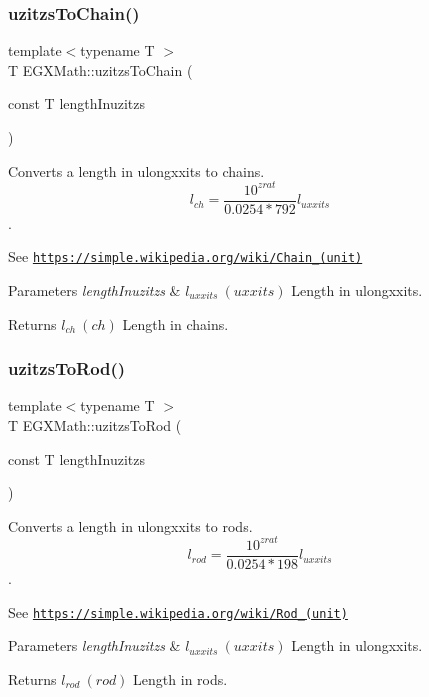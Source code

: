 \subsubsection{\texorpdfstring{uzitzs\+To\+Chain()}{uzitzsToChain()}}
{\footnotesize\ttfamily template$<$typename T $>$ \\
T E\+G\+X\+Math\+::uzitzs\+To\+Chain (\begin{DoxyParamCaption}\item[{const T}]{length\+Inuzitzs }\end{DoxyParamCaption})}



Converts a length in ulongxxits to chains. \[ l_{ch}= \frac{10^{zrat}}{0.0254 * 792} l_{uxxits} \]. 

See \href{https://simple.wikipedia.org/wiki/Chain_(unit)}{\tt https\+://simple.\+wikipedia.\+org/wiki/\+Chain\+\_\+(unit)} 
\begin{DoxyParams}{Parameters}
{\em length\+Inuzitzs} & $ l_{uxxits}\ (uxxits)$ Length in ulongxxits. \\
\hline
\end{DoxyParams}
\begin{DoxyReturn}{Returns}
$ l_{ch}\ (ch)$ Length in chains. 
\end{DoxyReturn}
\mbox{\label{group___e_g_x_math-_conversions-_length_conversions-_non-_s_i-uzitzs-_surveyors_gaf6062ab067930d296074de9e8301871d}} 
\subsubsection{\texorpdfstring{uzitzs\+To\+Rod()}{uzitzsToRod()}}
{\footnotesize\ttfamily template$<$typename T $>$ \\
T E\+G\+X\+Math\+::uzitzs\+To\+Rod (\begin{DoxyParamCaption}\item[{const T}]{length\+Inuzitzs }\end{DoxyParamCaption})}



Converts a length in ulongxxits to rods. \[ l_{rod}= \frac{10^{zrat}}{0.0254 * 198} l_{uxxits} \]. 

See \href{https://simple.wikipedia.org/wiki/Rod_(unit)}{\tt https\+://simple.\+wikipedia.\+org/wiki/\+Rod\+\_\+(unit)} 
\begin{DoxyParams}{Parameters}
{\em length\+Inuzitzs} & $ l_{uxxits}\ (uxxits)$ Length in ulongxxits. \\
\hline
\end{DoxyParams}
\begin{DoxyReturn}{Returns}
$ l_{rod}\ (rod)$ Length in rods. 
\end{DoxyReturn}
